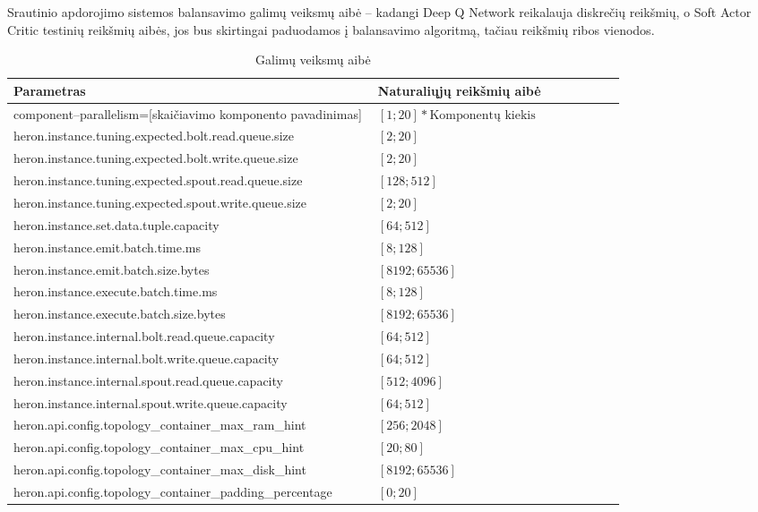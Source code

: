 \documentclass{VUMIFPSbakalaurinis}
\begin{document}
Srautinio apdorojimo sistemos balansavimo galimų veiksmų aibė – kadangi Deep Q Network reikalauja diskrečių reikšmių, o Soft Actor Critic testinių reikšmių aibės, jos bus skirtingai paduodamos į balansavimo algoritmą, tačiau reikšmių ribos vienodos.
\begin{longtable}{|p{0.59\linewidth}|p{0.4\linewidth}|}
    \caption{Galimų veiksmų aibė}
    \label{param–table}\\
    \hline
    \rowcolor[HTML]{C0C0C0} 
    Parametras     & Naturaliųjų reikšmių aibė       \\ \hline
    \endfirsthead
    \endhead
    component–parallelism=[skaičiavimo komponento pavadinimas]& \([1;20] * \text{Komponentų kiekis}\)\\ \hline
    heron.instance.tuning.expected.bolt.read.queue.size       & \([2;20]\) \\ \hline
    heron.instance.tuning.expected.bolt.write.queue.size      & \([2;20]\) \\ \hline
    heron.instance.tuning.expected.spout.read.queue.size      & \([128;512]\) \\ \hline
    heron.instance.tuning.expected.spout.write.queue.size     & \([2;20]\) \\ \hline
    heron.instance.set.data.tuple.capacity                    & \([64;512]\) \\ \hline
    heron.instance.emit.batch.time.ms                         & \([8;128]\) \\ \hline
    heron.instance.emit.batch.size.bytes                      & \([8192;65536]\) \\ \hline
    heron.instance.execute.batch.time.ms                      & \([8;128]\) \\ \hline
    heron.instance.execute.batch.size.bytes                   & \([8192;65536]\) \\ \hline
    heron.instance.internal.bolt.read.queue.capacity          & \([64;512]\) \\ \hline
    heron.instance.internal.bolt.write.queue.capacity         & \([64;512]\) \\ \hline
    heron.instance.internal.spout.read.queue.capacity         & \([512;4096]\) \\ \hline
    heron.instance.internal.spout.write.queue.capacity        & \([64;512]\) \\ \hline
    heron.api.config.topology\_container\_max\_ram\_hint      & \([256;2048]\) \\ \hline
    heron.api.config.topology\_container\_max\_cpu\_hint      & \([20;80]\) \\ \hline
    heron.api.config.topology\_container\_max\_disk\_hint     & \([8192;65536]\) \\ \hline
    heron.api.config.topology\_container\_padding\_percentage & \([0;20]\) \\ \hline
\end{longtable}
\end{document}
